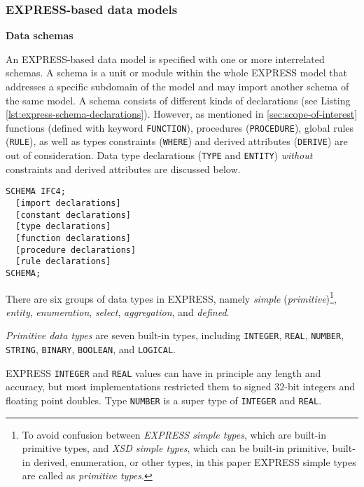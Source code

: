 \subsubsection{EXPRESS-based data models}\label{sec:express-based-data-models}

\noindent\textbf{Data schemas}

An EXPRESS-based data model is specified with one or more interrelated schemas.
A schema is a unit or module within the whole EXPRESS model that addresses a specific subdomain of the model and may import another schema of the same model.
A schema consists of different kinds of declarations (see Listing \ref{lst:express-schema-declarations}).
However, as mentioned in \autoref{sec:scope-of-interest} functions (defined with keyword \texttt{FUNCTION}), procedures (\texttt{PROCEDURE}), global rules (\texttt{RULE}), as well as types constraints (\texttt{WHERE}) and derived attributes (\texttt{DERIVE}) are out of consideration.
Data type declarations (\texttt{TYPE} and \texttt{ENTITY}) \textit{without} constraints and derived attributes are discussed below.

\begin{lstlisting}[caption={The structure of an EXPRESS schema.},label=lst:express-schema-declarations]
SCHEMA IFC4;
  [import declarations]
  [constant declarations]
  [type declarations]
  [function declarations]
  [procedure declarations]
  [rule declarations]
SCHEMA;
\end{lstlisting}




There are six groups of data types in EXPRESS, namely \emph{simple} (\emph{primitive})\footnote{
    To avoid confusion between \emph{EXPRESS simple types}, which are built-in primitive types, and \emph{XSD simple types}, which can be built-in primitive, built-in derived, enumeration, or other types, in this paper EXPRESS simple types are called as \emph{primitive types}.
}, \emph{entity}, \emph{enumeration}, \emph{select}, \emph{aggregation}, and \emph{defined}.

% 
% 
\emph{Primitive data types} are seven built-in types, including \texttt{IN\-TE\-GER}, \texttt{REAL}, \texttt{NUM\-BER}, \texttt{STRING}, \texttt{BI\-NA\-RY}, \texttt{BOOL\-EAN}, and \texttt{LOG\-I\-CAL}.

EXPRESS \texttt{INTEGER} and \texttt{REAL} values can have in principle any length and accuracy, but most implementations restricted them to signed 32-bit integers
and floating point doubles.
Type \texttt{NUM\-BER} is a super type of \texttt{IN\-TE\-GER} and \texttt{REAL}.

